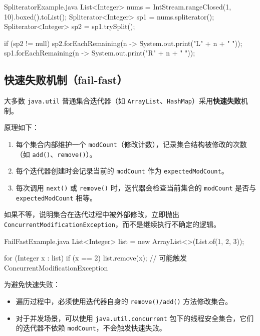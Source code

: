 \begin{codeblock}[Java]{SpliteratorExample.java}
List<Integer> nums = IntStream.rangeClosed(1, 10).boxed().toList();
Spliterator<Integer> sp1 = nums.spliterator();
Spliterator<Integer> sp2 = sp1.trySplit();

if (sp2 != null) {
    sp2.forEachRemaining(n -> System.out.print("L" + n + " "));
}
sp1.forEachRemaining(n -> System.out.print("R" + n + " "));
\end{codeblock}

\subsection{快速失败机制（fail-fast）}
大多数 \texttt{java.util} 普通集合迭代器（如 \texttt{ArrayList}、\texttt{HashMap}）采用\textbf{快速失败}机制。

原理如下：

\begin{enumerate}
    \item 每个集合内部维护一个 \texttt{modCount}（修改计数），记录集合结构被修改的次数（如 \texttt{add()}、\texttt{remove()}）。
    \item 每个迭代器创建时会记录当前的 \texttt{modCount} 作为 \texttt{expectedModCount}。
    \item 每次调用 \texttt{next()} 或 \texttt{remove()} 时，迭代器会检查当前集合的 \texttt{modCount} 是否与 \texttt{expectedModCount} 相等。
\end{enumerate}

如果不等，说明集合在迭代过程中被外部修改，立即抛出 \texttt{ConcurrentModificationException}，而不是继续执行不确定的逻辑。

\begin{codeblock}[Java]{FailFastExample.java}
List<Integer> list = new ArrayList<>(List.of(1, 2, 3));

for (Integer x : list) {
    if (x == 2) {
        list.remove(x); // 可能触发 ConcurrentModificationException
    }
}
\end{codeblock}


为避免快速失败：
\begin{itemize}
    \item 遍历过程中，必须使用迭代器自身的 \texttt{remove()/add()} 方法修改集合。
    \item 对于并发场景，可以使用 \texttt{java.util.concurrent} 包下的线程安全集合，它们的迭代器不依赖 \texttt{modCount}，不会触发快速失败。
\end{itemize}

